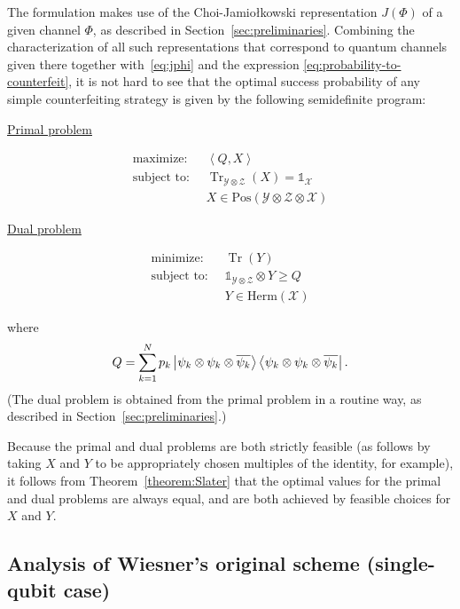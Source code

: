 \documentclass[11pt,letterpaper]{article}
\theoremstyle{definition}
\newcommand{\microspace}{\mspace{0.5mu}}
\newcommand{\tr}{\operatorname{Tr}}
\newcommand{\ip}[2]{\left\langle #1 , #2\right\rangle}
\def\I{\mathbb{1}}
\newcommand{\setft}[1]{\mathrm{#1}}
\newcommand{\herm}[1]{\setft{Herm}\left(#1\right)}
\newcommand{\pos}[1]{\setft{Pos}\left(#1\right)}
\def \lket {\left|}
\def \rket {\right\rangle}
\def \lbra {\left\langle}
\def \rbra {\right|}
\newcommand{\ket}[1]{\lket\microspace #1 \microspace\rket}
\newcommand{\bra}[1]{\lbra\microspace #1 \microspace\rbra}
\def\X{\mathcal{X}}
\def\Y{\mathcal{Y}}
\def\Z{\mathcal{Z}}
\begin{document}
The formulation makes use of the Choi-Jamio{\l}kowski representation 
$J(\Phi)$ of a given channel $\Phi$, as described in
Section~\ref{sec:preliminaries}.
Combining the characterization of all such representations that
correspond to quantum channels given there together
with~\eqref{eq:jphi} and the expression
\eqref{eq:probability-to-counterfeit}, it is not hard to see that the
optimal success probability of any simple counterfeiting strategy is
given by the following semidefinite program:\vspace{2mm}
\begin{center}
\begin{minipage}{0.5\textwidth}
  \centerline{\underline{Primal problem}}\vspace{-6mm}
  \begin{align*}
    \text{maximize:}\;\; & \ip{Q}{X}\\
    \text{subject to:}\;\; & \tr_{\Y\otimes\Z}(X) = \I_{\X}\\
    & X\in\pos{\Y\otimes\Z\otimes\X}
  \end{align*}
\end{minipage}\hspace*{5mm}
\begin{minipage}{0.4\textwidth}
  \centerline{\underline{Dual problem}}\vspace{-6mm}
  \begin{align*}
    \text{minimize:}\;\; & \tr(Y)\\
    \text{subject to:}\;\; & \I_{\Y\otimes\Z}\otimes Y \geq Q\\
    & Y \in \herm{\X}
  \end{align*}
\end{minipage}
\end{center}
where
\[
Q = \sum_{k = 1}^N p_k
\ket{\psi_k \otimes \psi_k \otimes \overline{\psi_k}}
\bra{\psi_k \otimes \psi_k \otimes \overline{\psi_k}}.
\]
(The dual problem is obtained from the primal problem in a routine way,
as described in Section~\ref{sec:preliminaries}.)

Because the primal and dual problems are both strictly feasible (as
follows by taking $X$ and $Y$ to be appropriately chosen multiples of
the identity, for example), it follows from
Theorem~\ref{theorem:Slater} that the optimal values for the primal
and dual problems are always equal, and are both achieved by feasible
choices for $X$ and $Y$.

\subsection{Analysis of Wiesner's original scheme (single-qubit case)}
\end{document}
